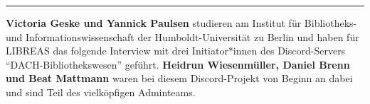 \begin{center}\rule{0.5\linewidth}{0.5pt}\end{center}

\textbf{Victoria Geske und Yannick Paulsen}  studieren am
Institut für Bibliotheks- und Informationswissenschaft der
Humboldt-Universität zu Berlin und haben für LIBREAS das folgende
Interview mit drei Initiator*innen des Discord-Servers
\enquote{DACH-Bibliothekswesen} geführt. \textbf{Heidrun Wiesenmüller, Daniel Brenn
und Beat Mattmann} waren bei diesem Discord-Projekt von Beginn an dabei
und sind Teil des vielköpfigen Adminteams.
